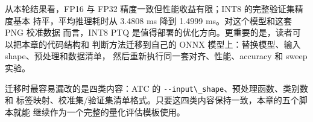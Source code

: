 从本轮结果看，FP16 与 FP32 精度一致但性能收益有限；INT8
的完整验证集精度基本 持平，平均推理耗时从 3.4808 ms 降到 1.4999
ms。对这个模型和这套 PNG 校准数据 而言，INT8 PTQ
是值得部署的优化方向。更重要的是，读者可以把本章的代码结构和
判断方法迁移到自己的 ONNX 模型上：替换模型、输入
shape、预处理和数据清单， 然后重新执行同一套对齐、性能、accuracy 和
sweep 实验。

迁移时最容易漏改的是四类内容：ATC 的
\passthrough{\lstinline!--input\_shape!}、预处理函数、类别数和
标签映射、校准集/验证集清单格式。只要这四类内容保持一致，本章的五个脚本就能
继续作为一个完整的量化评估模板使用。
